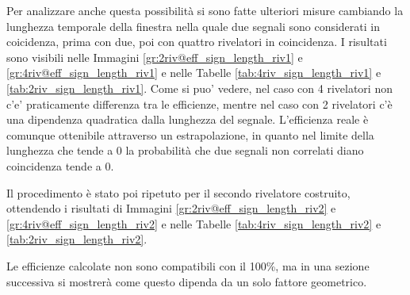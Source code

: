 Per analizzare anche questa possibilit\`a si sono fatte ulteriori misure cambiando la lunghezza temporale della finestra nella quale due segnali sono considerati in coicidenza, prima con due, poi con quattro rivelatori in coincidenza. I risultati sono visibili nelle Immagini \ref{gr:2riv@eff_sign_length_riv1} e \ref{gr:4riv@eff_sign_length_riv1} e nelle Tabelle \ref{tab:4riv_sign_length_riv1} e \ref{tab:2riv_sign_length_riv1}.
Come si puo' vedere, nel caso con 4 rivelatori non c'e' praticamente differenza tra le efficienze, mentre nel caso con 2 rivelatori c'\`e una dipendenza quadratica dalla lunghezza del segnale. L'efficienza reale \`e comunque ottenibile attraverso un estrapolazione, in quanto nel limite della lunghezza che tende a 0 la probabilit\`a che due segnali non correlati diano coincidenza tende a 0.

Il procedimento \`e stato poi ripetuto per il secondo rivelatore costruito, ottendendo i risultati di Immagini \ref{gr:2riv@eff_sign_length_riv2} e \ref{gr:4riv@eff_sign_length_riv2} e nelle Tabelle \ref{tab:4riv_sign_length_riv2} e \ref{tab:2riv_sign_length_riv2}.

Le efficienze calcolate non sono compatibili con il 100\%, ma in una sezione successiva si mostrer\`a come questo dipenda da un solo fattore geometrico.
